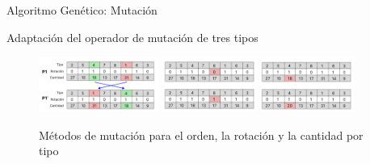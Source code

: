 \documentclass[handout]{beamer}
\begin{document}
\begin{frame}{Algoritmo Genético: Mutación}
    \begin{exampleblock}{Adaptación del operador de mutación de tres tipos}
        \vspace{1cm}
        \begin{figure}[H]
            \centering
            \includegraphics[width=0.35\textwidth]{pic/ag-mutacion1.png}
            \includegraphics[width=0.275\textwidth]{pic/ag-mutacion2.png}
            \includegraphics[width=0.275\textwidth]{pic/ag-mutacion3.png}
            \caption*{Métodos de mutación para el orden, la rotación y la cantidad por tipo}
            \label{fig:mutacion}
        \end{figure}
    \end{exampleblock}
\end{frame}
\end{document}
